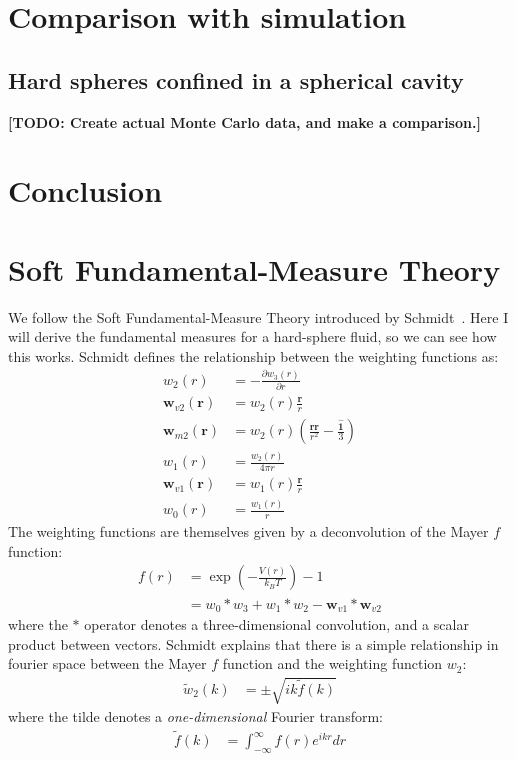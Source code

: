 \documentclass[letterpaper,twocolumn,amsmath,amssymb,prb]{revtex4-1}
\newcommand{\red}[1]{{\bf \color{red} #1}}
\newcommand{\rr}{\textbf{r}}
\newcommand{\fixme}[1]{\red{[#1]}}
\begin{document}
\section{Comparison with simulation}

\subsection{Hard spheres confined in a spherical cavity}

\fixme{TODO: Create actual Monte Carlo data, and make a comparison.}

\section{Conclusion}

\appendix

\section{Soft Fundamental-Measure Theory}

We follow the Soft Fundamental-Measure Theory introduced by
Schmidt~\cite{schmidt2000fluid}.  Here I will derive the fundamental
measures for a hard-sphere fluid, so we can see how this works.
Schmidt defines the relationship between the weighting functions as:
\begin{align}
  w_2(r) &= -\frac{\partial w_3(r)}{\partial r} \\
  \mathbf{w}_{v2}(\rr) &= w_2(r)\frac{\rr}{r} \\
  \mathbf{w}_{m2}(\rr) &= w_2(r)\left( \frac{\rr \rr}{r^2}
                              - \frac{\mathbf{\hat{1}}}{3} \right) \\
  w_1(r) &= \frac{w_2(r)}{4\pi r} \\
  \mathbf{w}_{v1}(\rr) &= w_1(r) \frac{\rr}{r} \\
  w_0(r) &= \frac{w_1(r)}{r}
\end{align}
The weighting functions are themselves given by a deconvolution of the
Mayer $f$ function:
\begin{align}
  f(r) &= \exp\left(-\frac{V(r)}{k_BT}\right) - 1 \\
  &= w_0 * w_3 + w_1 * w_2 - \mathbf{w}_{v1} * \mathbf{w}_{v2}
\end{align}
where the $*$ operator denotes a three-dimensional convolution, and a
scalar product between vectors.  Schmidt explains that there is a
simple relationship in fourier space between the Mayer $f$ function
and the weighting function $w_2$:
\begin{align}
  \tilde{w}_2(k) &= \pm \sqrt{ik\tilde{f}(k)} \label{eq:w2fromf}
\end{align}
where the tilde denotes a \emph{one-dimensional} Fourier transform:
\begin{align}
  \tilde{f}(k) &= \int_{-\infty}^\infty f(r) e^{ikr} dr
\end{align}
\end{document}
